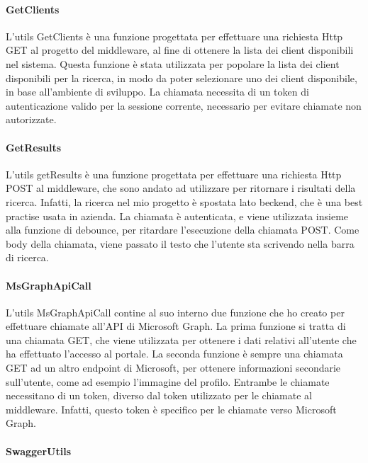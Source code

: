 \paragraph{GetClients}\label{par:get-clients}
L'utils GetClients è una funzione progettata per effettuare una richiesta Http GET al progetto del middleware, al fine di
ottenere la lista dei client disponibili nel sistema. Questa funzione è stata utilizzata per popolare la lista dei client disponibili
per la ricerca, in modo da poter selezionare uno dei client disponibile, in base all'ambiente di sviluppo.
La chiamata necessita di un token di autenticazione valido per la sessione corrente, necessario per evitare chiamate non autorizzate.

\paragraph{GetResults}\label{par:get-results}
L'utils getResults è una funzione progettata per effettuare una richiesta Http POST al middleware, che sono andato ad utilizzare per ritornare 
i risultati della ricerca. Infatti, la ricerca nel mio progetto è spostata lato beckend, che è una best practise usata in azienda.
La chiamata è autenticata, e viene utilizzata insieme alla funzione di debounce, per ritardare l'esecuzione della chiamata POST. Come body della chiamata,
viene passato il testo che l'utente sta scrivendo nella barra di ricerca.

\paragraph{MsGraphApiCall}\label{par:ms-graph-api-call}
L'utils MsGraphApiCall contine al suo interno due funzione che ho creato per effettuare chiamate all'API di Microsoft Graph. 
La prima funzione si tratta di una chiamata GET, che viene utilizzata per ottenere i dati relativi all'utente che ha effettuato l'accesso al portale.
La seconda funzione è sempre una chiamata GET ad un altro endpoint di Microsoft, per ottenere informazioni secondarie sull'utente, come ad esempio l'immagine del profilo.
Entrambe le chiamate necessitano di un token, diverso dal token utilizzato per le chiamate al middleware. Infatti, questo token è specifico per le chiamate verso Microsoft Graph.

\paragraph{SwaggerUtils}\label{par:swagger-utils}


